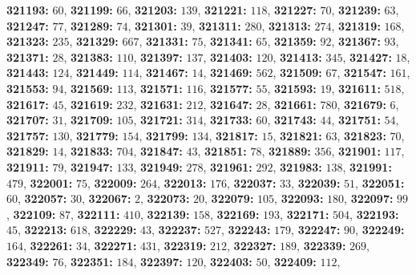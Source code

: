 \textsf{\bfseries 321193:} $60$, \textsf{\bfseries 321199:} $66$, \textsf{\bfseries 321203:} $139$, \textsf{\bfseries 321221:} $118$, \textsf{\bfseries 321227:} $70$, \textsf{\bfseries 321239:} $63$, \textsf{\bfseries 321247:} $77$, \textsf{\bfseries 321289:} $74$, \textsf{\bfseries 321301:} $39$, \textsf{\bfseries 321311:} $280$, \textsf{\bfseries 321313:} $274$, \textsf{\bfseries 321319:} $168$, \textsf{\bfseries 321323:} $235$, \textsf{\bfseries 321329:} $667$, \textsf{\bfseries 321331:} $75$, \textsf{\bfseries 321341:} $65$, \textsf{\bfseries 321359:} $92$, \textsf{\bfseries 321367:} $93$, \textsf{\bfseries 321371:} $28$, \textsf{\bfseries 321383:} $110$, \textsf{\bfseries 321397:} $137$, \textsf{\bfseries 321403:} $120$, \textsf{\bfseries 321413:} $345$, \textsf{\bfseries 321427:} $18$, \textsf{\bfseries 321443:} $124$, \textsf{\bfseries 321449:} $114$, \textsf{\bfseries 321467:} $14$, \textsf{\bfseries 321469:} $562$, \textsf{\bfseries 321509:} $67$, \textsf{\bfseries 321547:} $161$, \textsf{\bfseries 321553:} $94$, \textsf{\bfseries 321569:} $113$, \textsf{\bfseries 321571:} $116$, \textsf{\bfseries 321577:} $55$, \textsf{\bfseries 321593:} $19$, \textsf{\bfseries 321611:} $518$, \textsf{\bfseries 321617:} $45$, \textsf{\bfseries 321619:} $232$, \textsf{\bfseries 321631:} $212$, \textsf{\bfseries 321647:} $28$, \textsf{\bfseries 321661:} $780$, \textsf{\bfseries 321679:} $6$, \textsf{\bfseries 321707:} $31$, \textsf{\bfseries 321709:} $105$, \textsf{\bfseries 321721:} $314$, \textsf{\bfseries 321733:} $60$, \textsf{\bfseries 321743:} $44$, \textsf{\bfseries 321751:} $54$, \textsf{\bfseries 321757:} $130$, \textsf{\bfseries 321779:} $154$, \textsf{\bfseries 321799:} $134$, \textsf{\bfseries 321817:} $15$, \textsf{\bfseries 321821:} $63$, \textsf{\bfseries 321823:} $70$, \textsf{\bfseries 321829:} $14$, \textsf{\bfseries 321833:} $704$, \textsf{\bfseries 321847:} $43$, \textsf{\bfseries 321851:} $78$, \textsf{\bfseries 321889:} $356$, \textsf{\bfseries 321901:} $117$, \textsf{\bfseries 321911:} $79$, \textsf{\bfseries 321947:} $133$, \textsf{\bfseries 321949:} $278$, \textsf{\bfseries 321961:} $292$, \textsf{\bfseries 321983:} $138$, \textsf{\bfseries 321991:} $479$, \textsf{\bfseries 322001:} $75$, \textsf{\bfseries 322009:} $264$, \textsf{\bfseries 322013:} $176$, \textsf{\bfseries 322037:} $33$, \textsf{\bfseries 322039:} $51$, \textsf{\bfseries 322051:} $60$, \textsf{\bfseries 322057:} $30$, \textsf{\bfseries 322067:} $2$, \textsf{\bfseries 322073:} $20$, \textsf{\bfseries 322079:} $105$, \textsf{\bfseries 322093:} $180$, \textsf{\bfseries 322097:} $99$, \textsf{\bfseries 322109:} $87$, \textsf{\bfseries 322111:} $410$, \textsf{\bfseries 322139:} $158$, \textsf{\bfseries 322169:} $193$, \textsf{\bfseries 322171:} $504$, \textsf{\bfseries 322193:} $45$, \textsf{\bfseries 322213:} $618$, \textsf{\bfseries 322229:} $43$, \textsf{\bfseries 322237:} $527$, \textsf{\bfseries 322243:} $179$, \textsf{\bfseries 322247:} $90$, \textsf{\bfseries 322249:} $164$, \textsf{\bfseries 322261:} $34$, \textsf{\bfseries 322271:} $431$, \textsf{\bfseries 322319:} $212$, \textsf{\bfseries 322327:} $189$, \textsf{\bfseries 322339:} $269$, \textsf{\bfseries 322349:} $76$, \textsf{\bfseries 322351:} $184$, \textsf{\bfseries 322397:} $120$, \textsf{\bfseries 322403:} $50$, \textsf{\bfseries 322409:} $112$, 
